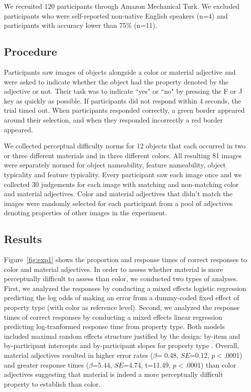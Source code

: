 \documentclass[12pt,letterpaper]{article}
\begin{document}
We recruited 120 participants through Amazon Mechanical Turk. We excluded participants who were self-reported non-native English speakers (n=4) and participants with accuracy lower than 75\% (n=11).

\subsection{Procedure} 

Participants saw images of objects alongside a color or material adjective and were asked to indicate whether the object had the property denoted by the adjective or not. Their task was to indicate ``yes" or ``no" by pressing the F or J key as quickly as possible. If participants did not respond within 4 seconds, the trial timed out. When participants responded correctly, a green border appeared around their selection, and when they responded incorrectly a red border appeared.

We collected perceptual difficulty norms for 12 objects that each occurred in two or three different materials and in three different colors. All resulting 81 images were separately normed for object nameability, feature nameability, object typicality and feature typicality. Every participant saw each image once and we collected 30 judgements for each image with matching and non-matching color and material adjectives. Color and material adjectives that didn't match the images were randomly selected for each participant from a pool of adjectives denoting properties of other images in the experiment.

\subsection{Results} 

Figure~\ref{fig:exp1} shows the proportion and response times of correct responses to color and material adjectives.  In order to assess whether material is more perceptually difficult to assess than color, we conducted two types of analyses. First, we analyzed the responses by conducting a mixed effects logistic regression predicting the log odds of making an error from a dummy-coded fixed effect of property type (with color as reference level). Second, we analyzed the response times of correct responses by conducting a mixed effects linear regression predicting log-tranformed response time from property type. Both models included maximal random effects structure justified by the design: by-item and by-participant intercepts and by-participant slopes for property type . Overall, material adjectives resulted in higher error rates ($\beta$= 0.48, $SE$=0.12, $p$$<$.0001) and greater response times ($\beta$=5.44, $SE$=4.74, t=11.49, $p$$<$.0001) than color adjectives suggesting that material is indeed a more perceptually difficult property to establish than color. 
\end{document}
